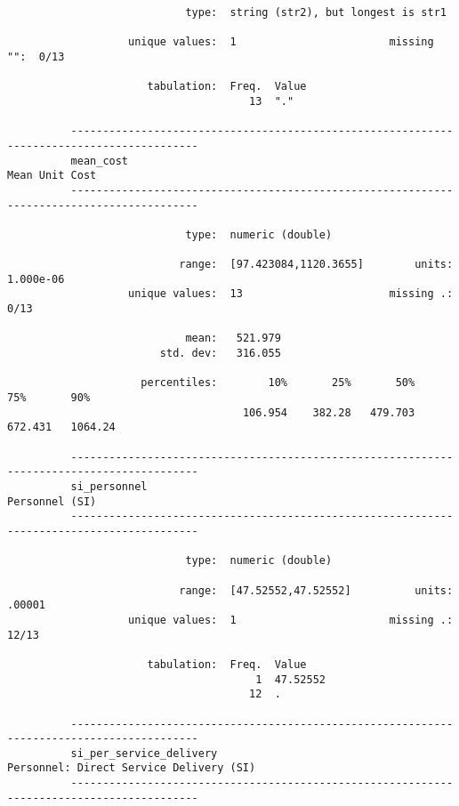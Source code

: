 \documentclass{article}
\begin{document}
\begin{verbatim}
                            type:  string (str2), but longest is str1
          
                   unique values:  1                        missing "":  0/13
          
                      tabulation:  Freq.  Value
                                      13  "."
          
          ------------------------------------------------------------------------------------------
          mean_cost                                                                   Mean Unit Cost
          ------------------------------------------------------------------------------------------
          
                            type:  numeric (double)
          
                           range:  [97.423084,1120.3655]        units:  1.000e-06
                   unique values:  13                       missing .:  0/13
          
                            mean:   521.979
                        std. dev:   316.055
          
                     percentiles:        10%       25%       50%       75%       90%
                                     106.954    382.28   479.703   672.431   1064.24
          
          ------------------------------------------------------------------------------------------
          si_personnel                                                                Personnel (SI)
          ------------------------------------------------------------------------------------------
          
                            type:  numeric (double)
          
                           range:  [47.52552,47.52552]          units:  .00001
                   unique values:  1                        missing .:  12/13
          
                      tabulation:  Freq.  Value
                                       1  47.52552
                                      12  .
          
          ------------------------------------------------------------------------------------------
          si_per_service_delivery                            Personnel: Direct Service Delivery (SI)
          ------------------------------------------------------------------------------------------
          

\end{verbatim}
\end{document}
